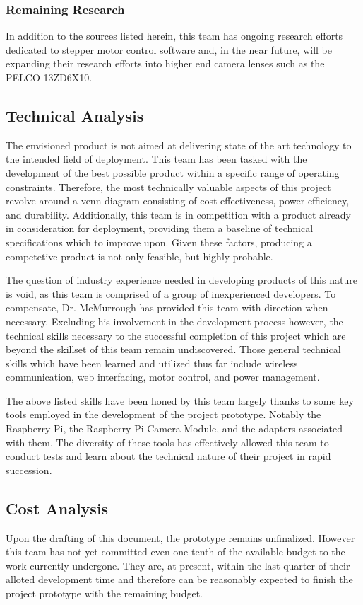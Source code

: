 \subsubsection{Remaining Research}
In addition to the sources listed herein, this team has ongoing research efforts dedicated to stepper motor control software and, in the near future, will be expanding their research efforts into higher end camera lenses such as the PELCO 13ZD6X10.

\subsection{Technical Analysis}
The envisioned product is not aimed at delivering state of the art technology to the intended field of deployment. This team has been tasked with the development of the best possible product within a specific range of operating constraints. Therefore, the most technically valuable aspects of this project revolve around a venn diagram consisting of cost effectiveness, power efficiency, and durability. Additionally, this team is in competition with a product already in consideration for deployment, providing them a baseline of technical specifications which to improve upon. Given these factors, producing a competetive product is not only feasible, but highly probable.

The question of industry experience needed in developing products of this nature is void, as this team is comprised of a group of inexperienced developers. To compensate, Dr. McMurrough has provided this team with direction when necessary. Excluding his involvement in the development process however, the technical skills necessary to the successful completion of this project which are beyond the skillset of this team remain undiscovered. Those general technical skills which have been learned and utilized thus far include wireless communication, web interfacing, motor control, and power management.

The above listed skills have been honed by this team largely thanks to some key tools employed in the development of the project prototype. Notably the Raspberry Pi, the Raspberry Pi Camera Module, and the adapters associated with them. The diversity of these tools has effectively allowed this team to conduct tests and learn about the technical nature of their project in rapid succession.  

\subsection{Cost Analysis}
Upon the drafting of this document, the prototype remains unfinalized. However this team has not yet committed even one tenth of the available budget to the work currently undergone. They are, at present, within the last quarter of their alloted development time and therefore can be reasonably expected to finish the project prototype with the remaining budget.

